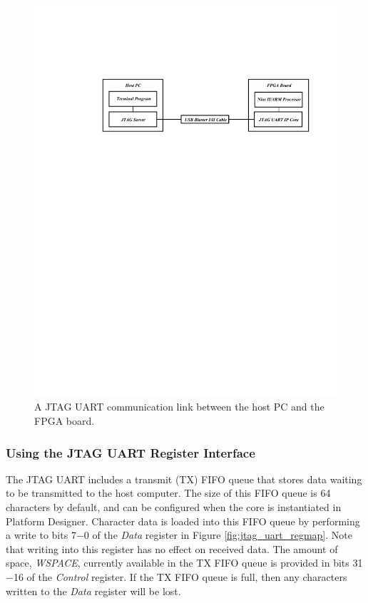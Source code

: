 \documentclass[11pt, twoside, pdftex]{article}
\begin{document}
\begin{figure}[h!]
   \begin{center}
       \includegraphics{figures/fig_jtag_uart_communication_link.pdf}
   \end{center}
   \caption{A JTAG UART communication link between the host PC and the FPGA board.}
	\label{fig:jtag_uart_communication_link}
\end{figure}

\subsubsection{Using the JTAG UART Register Interface}

The JTAG UART includes a transmit (TX) FIFO queue that stores data 
waiting to be transmitted to the host computer. The size of this FIFO queue is 64 characters by default, and can be configured when the core is instantiated in Platform Designer.  
Character data is loaded into this FIFO queue by performing a write to bits 7$-$0
of the {\it Data} register in Figure \ref{fig:jtag_uart_regmap}.  
Note that writing into this register has no effect 
on received data.  The amount of space, {\it WSPACE}, currently available in the TX FIFO queue is 
provided in bits 31$-$16 of the {\it Control} register.  If
the TX FIFO queue is full, then any characters written to the {\it Data} register will be lost.
\end{document}
